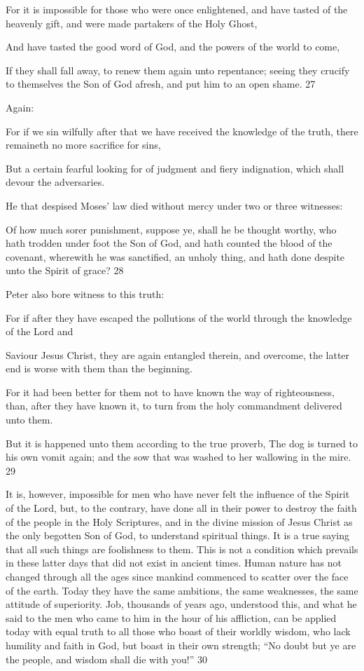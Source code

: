 For it is impossible for those who were once enlightened, and have tasted of the heavenly
gift, and were made partakers of the Holy Ghost,

And have tasted the good word of God, and the powers of the world to come,

If they shall fall away, to renew them again unto repentance; seeing they crucify to
themselves the Son of God afresh, and put him to an open shame. 27

Again:

For if we sin wilfully after that we have received the knowledge of the truth, there remaineth
no more sacrifice for sins,

But a certain fearful looking for of judgment and fiery indignation, which shall devour the
adversaries.

He that despised Moses' law died without mercy under two or three witnesses:

Of how much sorer punishment, suppose ye, shall he be thought worthy, who hath trodden
under foot the Son of God, and hath counted the blood of the covenant, wherewith he was
sanctified, an unholy thing, and hath done despite unto the Spirit of grace? 28

Peter also bore witness to this truth:

For if after they have escaped the pollutions of the world through the knowledge of the Lord
and

Saviour Jesus Christ, they are again entangled therein, and overcome, the latter end is worse
with them than the beginning.

For it had been better for them not to have known the way of righteousness, than, after they
have known it, to turn from the holy commandment delivered unto them.

But it is happened unto them according to the true proverb, The dog is turned to his own
vomit again; and the sow that was washed to her wallowing in the mire. 29

It is, however, impossible for men who have never felt the influence of the Spirit of the Lord,
but, to the contrary, have done all in their power to destroy the faith of the people in the Holy
Scriptures, and in the divine mission of Jesus Christ as the only begotten Son of God, to
understand spiritual things. It is a true saying that all such things are foolishness to them.
This is not a condition which prevails in these latter days that did not exist in ancient times.
Human nature has not changed through all the ages since mankind commenced to scatter
over the face of the earth. Today they have the same ambitions, the same weaknesses, the
same attitude of superiority. Job, thousands of years ago, understood this, and what he said to
the men who came to him in the hour of his affliction, can be applied today with equal truth
to all those who boast of their worldly wisdom, who lack humility and faith in God, but boast
in their own strength; ``No doubt but ye are the people, and wisdom shall die with you!'' 30

